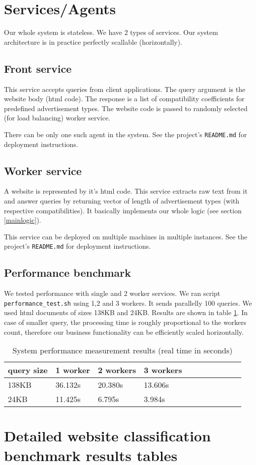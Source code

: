 \documentclass[a4paper]{article}
\begin{document}
\section{Services/Agents}
Our whole system is stateless.
We have 2 types of services.
Our system architecture is in practice perfectly scallable (horizontally).

\subsection{Front service}

This service accepts queries from client applications.
The query argument is the website body (html code).
The response is a list of compatibility coefficients for predefined advertisement types.
The website code is passed to randomly selected (for load balancing) worker service.

There can be only one such agent in the system.
See the project's \texttt{README.md} for deployment instructions.


\subsection{Worker service}
A website is represented by it's html code.
This service extracts raw text from it and answer queries by returning vector of length of advertisement types
(with respective compatibilities).
It basically implements our whole logic (see section \ref{mainlogic}).

This service can be deployed on multiple machines in multiple instances.
See the project's \texttt{README.md} for deployment instructions.

\subsection {Performance benchmark}

We tested performance with single and 2 worker services.
We ran script \texttt{performance\_test.sh} using 1,2 and 3 workers.
It sends parallelly 100 queries.
We used html documents of sizes 138KB and 24KB.
Results are shown in table \ref{table:perf}.
In case of smaller query, the processing time is roughly proportional to the workers count,
therefore our business functionality can be efficiently scaled horizontally.

\begin{table}[!hbt]
    \caption{ System performance measurement results (real time in seconds)
    \label{table:perf}
    }
\footnotesize
\begin{center}
    \begin{tabular}{|l|l|l|l|l|l|l|l|l|l|l|}
    \hline
        query size & 1 worker & 2 workers & 3 workers\\
    \hline
        138KB & 36.132s&20.380s&13.606s\\
    \hline
        24KB &11.425s&6.795s&3.984s\\
    \hline
    \end{tabular}
\end{center}
\end{table}

\appendix
\section{Detailed website classification benchmark results tables}
% 

\end{document}

